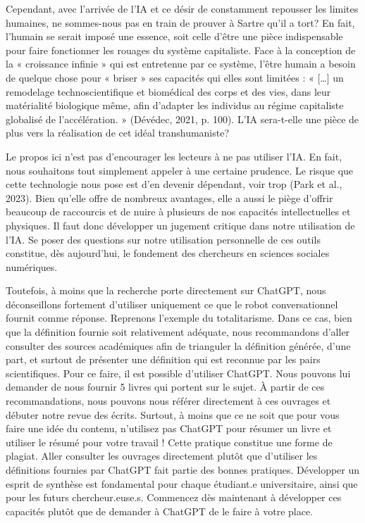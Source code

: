 \documentclass[
  letterpaper,
  DIV=11,
  numbers=noendperiod]{scrreprt}
\begin{document}
Cependant, avec l'arrivée de l'IA et ce désir de constamment repousser
les limites humaines, ne sommes-nous pas en train de prouver à Sartre
qu'il a tort? En fait, l'humain se serait imposé une essence, soit celle
d'être une pièce indispensable pour faire fonctionner les rouages du
système capitaliste. Face à la conception de la « croissance infinie »
qui est entretenue par ce système, l'être humain a besoin de quelque
chose pour « briser » ses capacités qui elles sont limitées : «
{[}\ldots{]} un remodelage technoscientifique et biomédical des corps et
des vies, dans leur matérialité biologique même, afin d'adapter les
individus au régime capitaliste globalisé de l'accélération. » (Dévédec,
2021, p. 100). L'IA sera-t-elle une pièce de plus vers la réalisation de
cet idéal transhumaniste?

Le propos ici n'est pas d'encourager les lecteurs à ne pas utiliser
l'IA. En fait, nous souhaitons tout simplement appeler à une certaine
prudence. Le risque que cette technologie nous pose est d'en devenir
dépendant, voir trop (Park et al., 2023). Bien qu'elle offre de nombreux
avantages, elle a aussi le piège d'offrir beaucoup de raccourcis et de
nuire à plusieurs de nos capacités intellectuelles et physiques. Il faut
donc développer un jugement critique dans notre utilisation de l'IA. Se
poser des questions sur notre utilisation personnelle de ces outils
constitue, dès aujourd'hui, le fondement des chercheurs en sciences
sociales numériques.

Toutefois, à moins que la recherche porte directement sur ChatGPT, nous
déconseillons fortement d'utiliser uniquement ce que le robot
conversationnel fournit comme réponse. Reprenons l'exemple du
totalitarisme. Dans ce cas, bien que la définition fournie soit
relativement adéquate, nous recommandons d'aller consulter des sources
académiques afin de trianguler la définition générée, d'une part, et
surtout de présenter une définition qui est reconnue par les pairs
scientifiques. Pour ce faire, il est possible d'utiliser ChatGPT. Nous
pouvons lui demander de nous fournir 5 livres qui portent sur le sujet.
À partir de ces recommandations, nous pouvons nous référer directement à
ces ouvrages et débuter notre revue des écrits. Surtout, à moins que ce
ne soit que pour vous faire une idée du contenu, n'utilisez pas ChatGPT
pour résumer un livre et utiliser le résumé pour votre travail ! Cette
pratique constitue une forme de plagiat. Aller consulter les ouvrages
directement plutôt que d'utiliser les définitions fournies par ChatGPT
fait partie des bonnes pratiques. Développer un esprit de synthèse est
fondamental pour chaque étudiant.e universitaire, ainsi que pour les
futurs chercheur.euse.s. Commencez dès maintenant à développer ces
capacités plutôt que de demander à ChatGPT de le faire à votre place.
\end{document}

